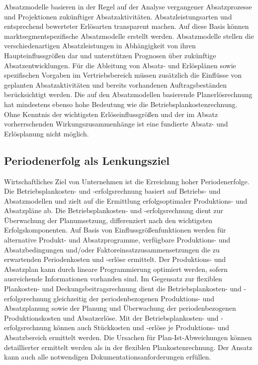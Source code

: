 Absatzmodelle basieren in der Regel auf der Analyse vergangener Absatzprozesse und Projektionen zukünftiger Absatzaktivitäten. Absatzleistungsarten und entsprechend bewerteter Erlösarten transparent machen. Auf diese Basis können marktsegmentspezifische Absatzmodelle erstellt werden. Absatzmodelle stellen die verschiedenartigen Absatzleistungen in Abhängigkeit von ihren Haupteinflussgrö{\ss}en dar und unterstützen Prognosen über zukünftige Absatzentwicklungen. Für die Ableitung von Absatz- und Erlösplänen sowie spezifischen Vorgaben im Vertriebsbereich müssen zusätzlich die Einflüsse von geplanten Absatzaktivitäten und bereits vorhandenen Auftragsbeständen berücksichtigt werden. Die auf den Absatzmodellen basierende Planerlösrechnung hat mindestens ebenso hohe Bedeutung wie die Betriebsplankostenrechnung. Ohne Kenntnis der wichtigsten Erlöseinflussgrö{\ss}en und der im Absatz vorherrschenden Wirkungszusammenhänge ist eine fundierte Absatz- und Erlösplanung nicht möglich.

\subsection{Periodenerfolg als Lenkungsziel}

Wirtschaftliches Ziel von Unternehmen ist die Erreichung hoher Periodenerfolge. Die Betriebsplankosten- und -erfolgsrechnung basiert auf Betriebs- und Absatzmodellen und zielt auf die Ermittlung erfolgsoptimaler Produktions- und Absatzpläne ab. Die Betriebsplankosten- und -erfolgsrechnung dient zur Überwachung der Planumsetzung, differenziert nach den wichtigsten Erfolgskomponenten. Auf Basis von Einflussgrö{\ss}enfunktionen werden für alternative Produkt- und Absatzprogramme, verfügbare Produktions- und Absatzbedingungen und/oder Faktoreinsatzzusammensetzungen die zu erwartenden Periodenkosten und -erlöse ermittelt. Der Produktions- und Absatzplan kann durch lineare Programmierung optimiert werden, sofern ausreichende Informationen vorhanden sind. Im Gegensatz zur flexiblen Plankosten- und Deckungsbeitragsrechnung dient die Betriebsplankosten- und -erfolgsrechnung gleichzeitig der periodenbezogenen Produktions- und Absatzplanung sowie der Planung und Überwachung der periodenbezogenen Produktionskosten und Absatzerlöse. Mit der Betriebsplankosten- und -erfolgsrechnung können auch Stückkosten und -erlöse je Produktions- und Absatzbereich ermittelt werden. Die Ursachen für Plan-Ist-Abweichungen können detaillierter ermittelt werden als in der flexiblen Plankostenrechnung. Der Ansatz kann auch alle notwendigen Dokumentationsanforderungen erfüllen.

